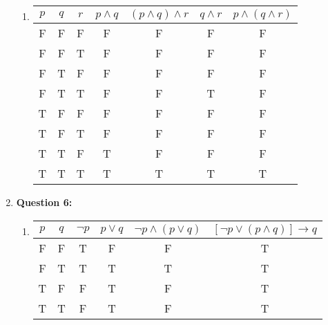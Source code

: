 \documentclass[11pt]{article}
\begin{document}
\begin{enumerate}
\begin{enumerate}[label=(\alph*)]
                \item  
                    \begin{tabular}{|c|c|c|c|c|c|c|}
                    \hline
                    $p$ & $q$ & $r$ & $p \land q$ & $(p \land q) \land r$ & $q \land r$ & $p\land(q\land r)$\\
                    \hline
                    F & F & F & F & F & F & F\\
                    F & F & T & F & F & F & F\\
                    F & T & F & F & F & F & F\\
                    F & T & T & F & F & T & F\\
                    T & F & F & F & F & F & F\\
                    T & F & T & F & F & F & F\\
                    T & T & F & T & F & F & F\\
                    T & T & T & T & T & T & T\\
                    \hline
                \end{tabular}
                    
            \end{enumerate}
    \item
        \textbf{Question 6:}
            \begin{enumerate}
                \item
                    \begin{tabular}{|c|c|c|c|c|c|}
                        \hline
                        $p$ & $q$ & $\lnot p$ & $p \lor q$ & $\lnot p \land (p \lor q)$ & $[\lnot p \lor (p \land q)] \rightarrow q$\\
                        \hline
                        F & F & T & F & F & T\\
                        F & T & T & T & T & T\\
                        T & F & F & T & F & T\\
                        T & T & F & T & F & T\\
                        \hline
                    \end{tabular}
                    

\end{enumerate}
\end{enumerate}
\end{document}
